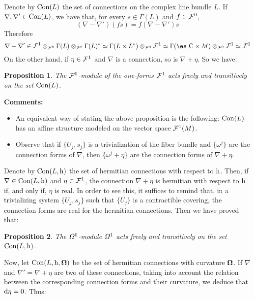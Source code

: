 \documentclass[12pt]{article}
\newtheorem{prop}{Proposition}
\def\d{{\rm d}}
\def\h{{\rm h}}
\def\curv{{\bf \Omega}}
\def\Complex{\mbox{\es C}}
\begin{document}
Denote by ${\rm Con}(L)$ the set of connections on the complex
line bundle $L$. If $\nabla , \nabla ' \in {\rm Con}(L)$, we have
that, for every $s \in \Gamma (L)$ and $f \in {\cal F}^0$, $$
(\nabla - \nabla ')(fs) = f(\nabla - \nabla ')s $$ Therefore $$
\nabla - \nabla '\in {\cal F}^1\otimes_{{\cal F}^0}\Gamma (L)
\otimes_{{\cal F}^0}\Gamma (L)^* \simeq \Gamma (L \times
L^*)\otimes_{{\cal F}^0}{\cal F}^1 \simeq \Gamma (\Complex \times
M)\otimes_{{\cal F}^0}{\cal F}^1 \simeq {\cal F}^1 $$ On the other
hand, if $\eta \in {\cal F}^1$ and $\nabla$ is a connection, so is
$\nabla + \eta$. So we have:

\begin{prop}
The ${\cal F}^0$-module of the one-forms
${\cal F}^1$
acts freely and transitively on the set
${\rm Con}(L)$.
\end{prop}

{\bf Comments:}
\begin{itemize}
\item
An equivalent way of stating the above proposition is the following:
${\rm Con}(L)$ has an affine structure modeled on the vector space
${\cal F}^1(M)$.
\item
Observe that if
$\{ U_j,s_j \}$
is a trivialization of the fiber bundle and
$\{ \omega^j \}$
are the connection forms of $\nabla$, then
$\{ \omega^j + \eta \}$
are the connection forms of $\nabla + \eta$.
\end{itemize}

Denote by ${\rm Con}(L,\h )$
the set of hermitian connections with respect to $\h$.
Then, if $\nabla \in {\rm Con}(L,\h )$
and $\eta \in {\cal F}^1$,
the connection $\nabla + \eta$
is hermitian with respect to $\h$
if, and only if, $\eta$ is real.
In order to see this, it suffices to remind that,
in a trivializing system $\{ U_j,s_j \}$
such that $\{ U_j \}$ is a contractible covering,
the connection forms are real for the hermitian connections.
Then we have proved that:

\begin{prop}
The ${\mit\Omega}^0$-module ${\mit\Omega}^1$
acts freely and transitively on the set
${\rm Con}(L,\h )$.
\end{prop}

Now, let ${\rm Con}(L,\h ,\curv )$
be the set of hermitian connections with curvature $\curv $.
If $\nabla$ and $\nabla ' = \nabla + \eta$
are two of these connections, taking into account the relation between
the corresponding connection forms and their curvature,
we deduce that $\d \eta = 0$. Thus:
\end{document}
